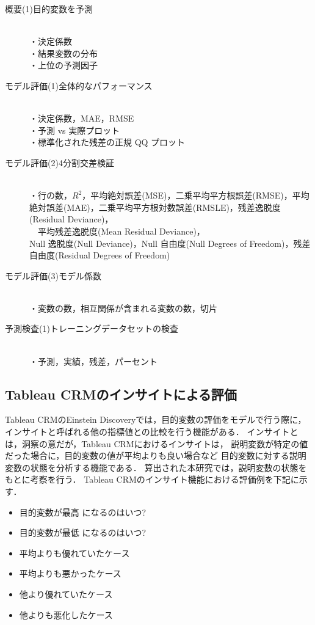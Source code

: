 \documentclass[submit,techrep,noauthor]{ipsj}
\begin{document}
\begin{description}
   \item[概要(1)目的変数を予測]\mbox{}\\
            ・決定係数\\
            ・結果変数の分布\\
            ・上位の予測因子
\end{description}
%
\begin{description}
   \item[モデル評価(1)全体的なパフォーマンス]\mbox{}\\
            ・決定係数，MAE，RMSE\\
            ・予測 vs 実際プロット\\
            ・標準化された残差の正規 QQ プロット
   \item[モデル評価(2)4分割交差検証]\mbox{}\\
            ・行の数，$R^{2}$，平均絶対誤差(MSE)，二乗平均平方根誤差(RMSE)，平均絶対誤差(MAE)，二乗平均平方根対数誤差(RMSLE)，残差逸脱度(Residual Deviance)，\\
            　平均残差逸脱度(Mean Residual Deviance)，\\Null 逸脱度(Null Deviance)，Null 自由度(Null Degrees of Freedom)，残差自由度(Residual Degrees of Freedom)
   \item[モデル評価(3)モデル係数]\mbox{}\\
	   ・変数の数，相互関係が含まれる変数の数，切片
\end{description}
%
\begin{description}
   \item[予測検査(1)トレーニングデータセットの検査]\mbox{}\\
            ・予測，実績，残差，パーセント
\end{description}

\subsection{Tableau CRMのインサイトによる評価}
Tableau CRMのEinstein Discoveryでは，目的変数の評価をモデルで行う際に，
インサイトと呼ばれる他の指標値との比較を行う機能がある．
インサイトとは，洞察の意だが，Tableau CRMにおけるインサイトは，
説明変数が特定の値だった場合に，目的変数の値が平均よりも良い場合など
目的変数に対する説明変数の状態を分析する機能である．
%
算出された本研究では，説明変数の状態をもとに考察を行う．
Tableau CRMのインサイト機能における評価例を下記に示す．

\begin{itemize}
\item 目的変数が最高 になるのはいつ?
\item 目的変数が最低 になるのはいつ?
\item 平均よりも優れていたケース
\item 平均よりも悪かったケース
\item 他より優れていたケース
\item 他よりも悪化したケース
\end{itemize}
\end{document}
